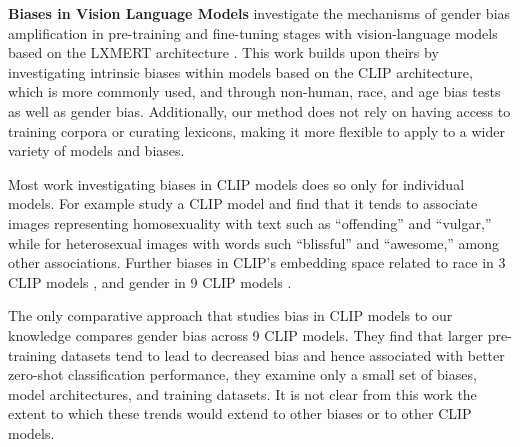 \noindent\textbf{Biases in Vision Language Models}
\citet{cabello-etal-2023-evaluating} investigate the mechanisms of gender bias amplification in pre-training and fine-tuning stages with vision-language models based on the LXMERT architecture \cite{tan-bansal-2019-lxmert}. This work builds upon theirs by investigating intrinsic biases within models based on the CLIP architecture, which is more commonly used, and through non-human, race, and age bias tests as well as gender bias. Additionally, our method does not rely on having access to training corpora or curating lexicons, making it more flexible to apply to a wider variety of models and biases.

Most work investigating biases in CLIP models does so only for individual models. For example \citet{Janghorbani2023Multi-ModalModels} study a  CLIP model and find that it tends to associate images representing homosexuality with text such as ``offending'' and ``vulgar,'' while for heterosexual images with words such ``blissful'' and ``awesome,'' among other associations. Further biases in CLIP's embedding space related to race in 3 CLIP models \cite{Wolfe2022MarkednessAI,Wolfe2022EvidenceAI,Wolfe2022AmericanAI}, and gender in 9 CLIP models \cite{Wolfe2023ContrastiveBias}.  

The only comparative approach that studies bias in CLIP models to our knowledge \citet{Berg2022ALearning} compares gender bias across 9 CLIP models. They find that larger pre-training datasets tend to lead to decreased bias and hence associated with better zero-shot classification performance, they examine only a small set of biases, model architectures, and training datasets. It is not clear from this work the extent to which these trends would extend to other biases or to other CLIP models.


